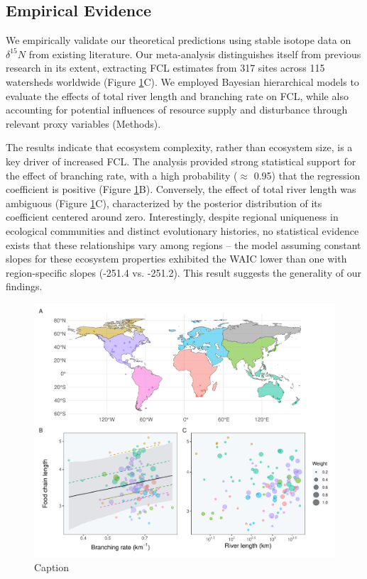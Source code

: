 \documentclass[11pt, class=article, crop=false]{standalone}
\begin{document}
\subsection{Empirical Evidence}

We empirically validate our theoretical predictions using stable isotope data on $\delta^{15}N$ from existing literature.
Our meta-analysis distinguishes itself from previous research in its extent, extracting FCL estimates from 317 sites across 115 watersheds worldwide (Figure \ref{fig:fcl-obs}C).
We employed Bayesian hierarchical models to evaluate the effects of total river length and branching rate on FCL, while also accounting for potential influences of resource supply and disturbance through relevant proxy variables (Methods).

The results indicate that ecosystem complexity, rather than ecosystem size, is a key driver of increased FCL.
The analysis provided strong statistical support for the effect of branching rate, with a high probability ($\approx$ 0.95) that the regression coefficient is positive (Figure \ref{fig:fcl-obs}B).
Conversely, the effect of total river length was ambiguous (Figure \ref{fig:fcl-obs}C), characterized by the posterior distribution of its coefficient centered around zero.
Interestingly, despite regional uniqueness in ecological communities and distinct evolutionary histories, no statistical evidence exists that these relationships vary among regions -- the model assuming constant slopes for these ecosystem properties exhibited the WAIC lower than one with region-specific slopes (-251.4 vs. -251.2).
This result suggests the generality of our findings. 

\begin{figure}
    \centering
    \includegraphics[width=0.9\linewidth]{output/fig_emp_fcl.pdf}
    \caption{Caption}
    \label{fig:fcl-obs}
\end{figure}
\end{document}
